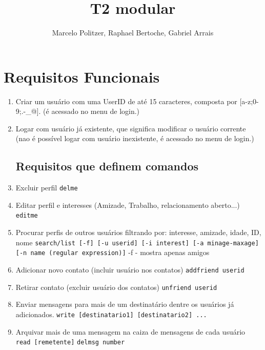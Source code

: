 \documentclass[a4paper,12pt]{article}
\title{T2 modular}
\author{Marcelo Politzer, Raphael Bertoche, Gabriel Arrais}
\begin{document}
\maketitle

\section{Requisitos Funcionais}


\begin{enumerate}
\item Criar um usuário com uma UserID de até 15 caracteres, composta por
[a-z;0-9;.-\_@]. (é acessado no menu de login.)

\item Logar com usuário já existente, que significa modificar o usuário
 corrente (nao é possível logar com usuário inexistente, é acessado no menu
 de login.)

\subsection{Requisitos que definem comandos}
\item Excluir perfil
 \newline\texttt{delme}

\item Editar perfil e interesses (Amizade, Trabalho, relacionamento aberto...)
\newline\texttt{editme}

\item Procurar perfis de outros usuários filtrando por: interesse, amizade,
 idade, ID, nome
 \newline\texttt{search/list [-f] [-u userid] [-i interest] [-a minage-maxage]
 [-n name (regular expression)]}
 \newline-f - mostra apenas amigos

\item Adicionar novo contato (incluir usuário nos contatos)
 \newline\texttt{addfriend userid}

\item Retirar contato (excluir usuário dos contatos)
 \newline\texttt{unfriend userid}

\item Enviar mensagens para mais de um destinatário dentre os usuários já
 adicionados.
 \newline\texttt{write [destinatario1] [destinatario2] ...}

\item Arquivar mais de uma mensagem na caiza de mensagens de cada usuário
 \newline\texttt{read [remetente]}
 \newline\texttt{delmsg number}

\end{enumerate}
\end{document}
